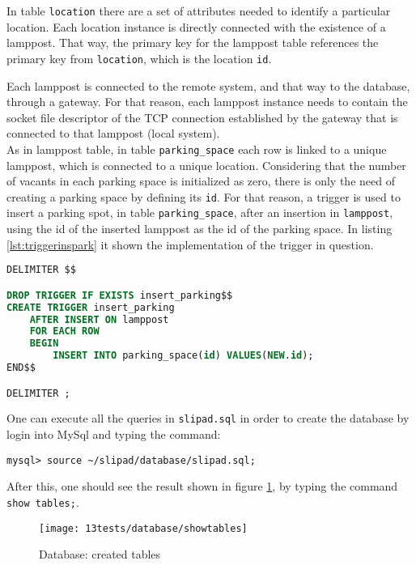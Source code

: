 In table \verb|location| there are a set of attributes needed to identify a particular location. Each location instance is directly connected with the existence of a lamppost. That way, the primary key for the lamppost table references the primary key from \verb|location|, which is the location \verb|id|.

Each lamppost is connected to the remote system, and that way to the database, through a gateway. For that reason, each lamppost instance needs to contain the socket file descriptor of the TCP connection established by the gateway that is connected to that lamppost (local system).\\

As in lamppost table, in table \verb|parking_space| each row is linked to a unique lamppost, which is connected to a unique location. Considering that the number of vacants in each parking space is initialized as zero, there is only the need of creating a parking space by defining its \verb|id|. For that reason, a trigger is used to insert a parking spot, in table \verb|parking_space|, after an insertion in \verb|lamppost|, using the id of the inserted lamppost as the id of the parking space. In listing \ref{lst:triggerinspark} it shown the implementation of the trigger in question.

\begin{lstlisting}[language=SQL, caption={Trigger to insert a parking spot after lampost insert.}, label={lst:triggerinspark}]
DELIMITER $$

DROP TRIGGER IF EXISTS insert_parking$$
CREATE TRIGGER insert_parking
	AFTER INSERT ON lamppost
	FOR EACH ROW
	BEGIN
		INSERT INTO parking_space(id) VALUES(NEW.id);
END$$

DELIMITER ;
\end{lstlisting}

One can execute all the queries in \verb|slipad.sql| in order to create the database by login into MySql and typing the command:
\begin{lstlisting}
mysql> source ~/slipad/database/slipad.sql;
\end{lstlisting}

After this, one should see the result shown in figure \ref{fig:showtables}, by typing the command \verb|show tables;|.

\begin{figure}[H]
	\centering	
	\texttt{[image: 13tests/database/showtables]}
	\caption{Database: created tables}
	\label{fig:showtables}
\end{figure}


